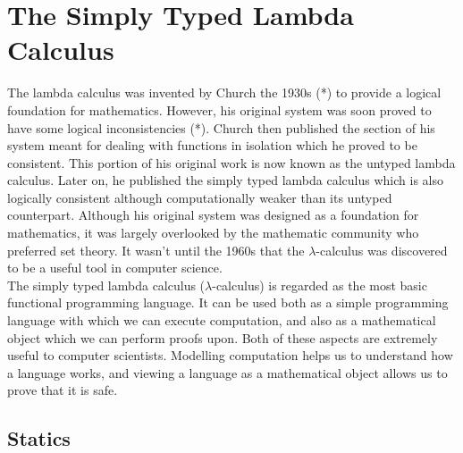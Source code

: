 \chapter{The Simply Typed Lambda Calculus}
\label{chap: stlc}

The lambda calculus was invented by Church the 1930s (*) to provide a logical foundation for 
mathematics. However, his original system was soon proved to have some logical inconsistencies (*). 
Church then published the section of his system meant for dealing with functions in isolation 
which he proved to be consistent. This portion of his original work is now known as the untyped 
lambda calculus. Later on, he published the simply typed lambda calculus \cite{church1940} which is also logically 
consistent although computationally weaker than its untyped counterpart. Although his original 
system was designed as a foundation for mathematics, it was largely overlooked by the mathematic 
community who preferred set theory. It wasn't until the 1960s that the $\lambda$-calculus was 
discovered to be a useful tool in computer science. \\

\noindent
The simply typed lambda calculus ($\lambda$-calculus) is regarded as the most basic functional programming language. 
It can be used both as a simple programming language with which we can execute computation, and 
also as a mathematical object which we can perform proofs upon. Both of these aspects are 
extremely useful to computer scientists. Modelling computation helps us to understand how a 
language works, and viewing a language as a mathematical object allows us to prove that it 
is safe. 

\section{Statics}

